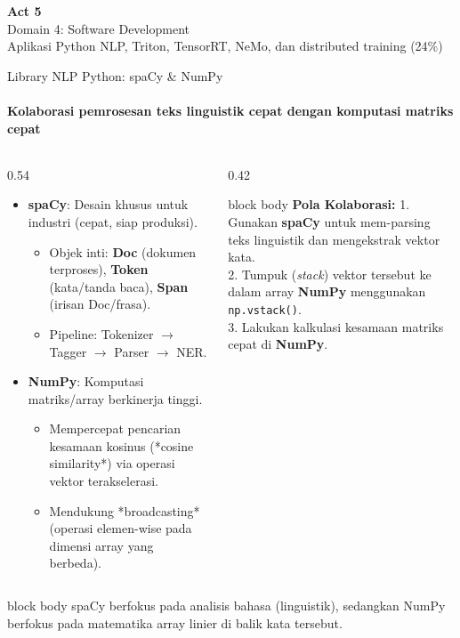 \documentclass[aspectratio=169,t]{beamer}
\newcommand{\acttitle}[3]{%
  \begin{frame}[plain]
    \vspace{1.5cm}
    \begin{center}
      {\color{nvgreen}\Huge\bfseries Act #1}\\[1.2em]
      {\color{nvwhite}\Huge #2}\\[0.8em]
      {\color{nvgray}\Large #3}
    \end{center}
  \end{frame}%
}
\newcommand{\takeaway}[1]{%
  \vspace{0.1em}
  \begin{beamercolorbox}[rounded=true,shadow=false,sep=5pt]{block body}
    \centering\footnotesize\color{nvlightgreen}#1
  \end{beamercolorbox}%
}
\begin{document}
\acttitle{5}{Domain 4: Software Development}{Aplikasi Python NLP, Triton, TensorRT, NeMo, dan distributed training (24\%)}

\begin{frame}{Library NLP Python: spaCy \& NumPy}
  \framesubtitle{Kolaborasi pemrosesan teks linguistik cepat dengan komputasi matriks cepat}
  \begin{columns}[T]
    \begin{column}{0.54\textwidth}
      \begin{itemize}\small
        \item \textbf{spaCy}: Desain khusus untuk industri (cepat, siap produksi).
          \begin{itemize}\scriptsize
            \item Objek inti: \textbf{Doc} (dokumen terproses), \textbf{Token} (kata/tanda baca), \textbf{Span} (irisan Doc/frasa).
            \item Pipeline: Tokenizer $\to$ Tagger $\to$ Parser $\to$ NER.
          \end{itemize}
        \item \textbf{NumPy}: Komputasi matriks/array berkinerja tinggi.
          \begin{itemize}\scriptsize
            \item Mempercepat pencarian kesamaan kosinus (*cosine similarity*) via operasi vektor terakselerasi.
            \item Mendukung *broadcasting* (operasi elemen-wise pada dimensi array yang berbeda).
          \end{itemize}
      \end{itemize}
    \end{column}
    \begin{column}{0.42\textwidth}
      \begin{center}
      \begin{beamercolorbox}[rounded=true,shadow=false,sep=8pt]{block body}
        {\footnotesize\color{nvlightgreen}\textbf{Pola Kolaborasi:}}
        \vspace{0.3em}
        {\scriptsize\color{nvwhite}
        1. Gunakan \textbf{spaCy} untuk mem-parsing teks linguistik dan mengekstrak vektor kata.\\
        2. Tumpuk (\emph{stack}) vektor tersebut ke dalam array \textbf{NumPy} menggunakan \texttt{np.vstack()}.\\
        3. Lakukan kalkulasi kesamaan matriks cepat di \textbf{NumPy}.}
      \end{beamercolorbox}
      \end{center}
    \end{column}
  \end{columns}
  \takeaway{spaCy berfokus pada analisis bahasa (linguistik), sedangkan NumPy berfokus pada matematika array linier di balik kata tersebut.}
\end{frame}
\end{document}
